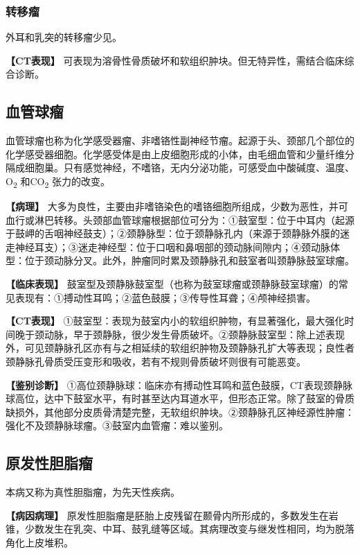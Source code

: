 \subsubsection{转移瘤}

外耳和乳突的转移瘤少见。

\textbf{【CT表现】}
可表现为溶骨性骨质破坏和软组织肿块。但无特异性，需结合临床综合诊断。

\subsection{血管球瘤}

血管球瘤也称为化学感受器瘤、非嗜铬性副神经节瘤。起源于头、颈部几个部位的化学感受器细胞。化学感受体是由上皮细胞形成的小体，由毛细血管和少量纤维分隔成细胞巢。只有感觉神经，不嗜铬，无内分泌功能，可感受血中酸碱度、温度、O\textsubscript{2}
和CO\textsubscript{2} 张力的改变。

\textbf{【病理】}
大多为良性，主要由非嗜铬染色的嗜铬细胞所组成，少数为恶性，并可血行或淋巴转移。头颈部血管球瘤根据部位可分为：①鼓室型：位于中耳内（起源于鼓岬的舌咽神经鼓支）；②颈静脉型：位于颈静脉孔内（来源于颈静脉外膜的迷走神经耳支）；③迷走神经型：位于口咽和鼻咽部的颈动脉间隙内；④颈动脉体型：位于颈动脉分叉。此外，肿瘤同时累及颈静脉孔和鼓室者叫颈静脉鼓室球瘤。

\textbf{【临床表现】}
鼓室型及颈静脉鼓室型（也称为鼓室球瘤或颈静脉鼓室球瘤）的常见表现有：①搏动性耳鸣；②蓝色鼓膜；③传导性耳聋；④颅神经损害。

\textbf{【CT表现】}
①鼓室型：表现为鼓室内小的软组织肿物，有显著强化，最大强化时间晚于颈动脉，早于颈静脉，很少发生骨质破坏。②颈静脉鼓室型：除上述表现外，可见颈静脉孔区亦有与之相延续的软组织肿物及颈静脉孔扩大等表现；良性者颈静脉孔骨质受压变形和吸收，若有不规则骨质破坏则很有可能恶变。

\textbf{【鉴别诊断】}
①高位颈静脉球：临床亦有搏动性耳鸣和蓝色鼓膜，CT表现颈静脉球高位，达中下鼓室水平，有时甚至达内耳道水平，但形态正常。除了鼓室的骨质缺损外，其他部分皮质骨清楚完整，无软组织肿块。②颈静脉孔区神经源性肿瘤：强化不及颈静脉球瘤。③鼓室内血管瘤：难以鉴别。

\subsection{原发性胆脂瘤}

本病又称为真性胆脂瘤，为先天性疾病。

\textbf{【病因病理】}
原发性胆脂瘤是胚胎上皮残留在颞骨内所形成的，多数发生在岩锥，少数发生在乳突、中耳、鼓乳缝等区域。其病理改变与继发性相同，均为脱落角化上皮堆积。

